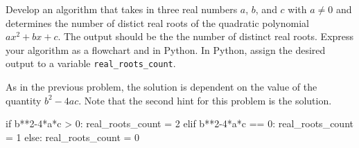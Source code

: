 \documentclass{ximera}
\begin{document}
\begin{question}
	Develop an algorithm that takes in three real numbers $a$, $b$, and $c$ with $a\neq 0$ and determines the number of distict real roots of the quadratic polynomial $ax^2+bx+c$. The output should be the the number of distinct real roots. Express your algorithm as a flowchart and in Python. In Python, assign the desired output to a variable \verb|real_roots_count|.
	\begin{hint}
	As in the previous problem, the solution is dependent on the value of the quantity $b^2-4ac$. Note that the second hint for this problem is the solution.
	\end{hint}
	\begin{hint}
            \begin{center}
           \end{center}
\begin{sageCell}
if b**2-4*a*c > 0:
	real_roots_count = 2
elif b**2-4*a*c == 0:
	real_roots_count = 1
else:
	real_roots_count = 0
\end{sageCell}
	\end{hint}
\end{question}
\end{document}
